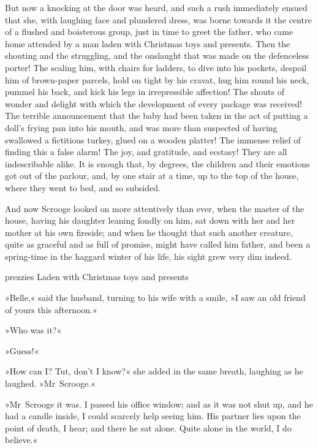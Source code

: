 But now a knocking at the door was heard, and such a rush immediately ensued that she, with laughing face and plundered dress, was borne towards it the centre of a flushed and boisterous group, just in time to greet the father, who came home attended by a man laden with Christmas toys and presents. Then the shouting and the struggling, and the onslaught that was made on the defenceless porter! The scaling him, with chairs for ladders, to dive into his pockets, despoil him of brown-paper parcels, hold on tight by his cravat, hug him round his neck, pummel his back, and kick his legs in irrepressible affection! The shouts of wonder and delight with which the development of every package was received! The terrible announcement that the baby had been taken in the act of putting a doll's frying pan into his mouth, and was more than suspected of having swallowed a fictitious turkey, glued on a wooden platter! The immense relief of finding this a false alarm! The joy, and gratitude, and ecstasy! They are all indescribable alike. It is enough that, by degrees, the children and their emotions got out of the parlour, and, by one stair at a time, up to the top of the house, where they went to bed, and so subsided.

And now Scrooge looked on more attentively than ever, when the master of the house, having his daughter leaning fondly on him, sat down with her and her mother at his own fireside; and when he thought that such another creature, quite as graceful and as full of promise, might have called him father, and been a spring-time in the haggard winter of his life, his sight grew very dim indeed.

\begin{colorbigpic}
	[\bigpicsize]
	{prezzies}
	{Laden with Christmas toys and presents}
\end{colorbigpic}


»Belle,« said the husband, turning to his wife with a smile, »I saw an old friend of yours this afternoon.«

»Who was it?«

»Guess!«

»How can I\@? Tut, don't I know?« she added in the same breath, laughing as he laughed. »Mr~Scrooge.«

»Mr~Scrooge it was. I passed his office window; and as it was not shut up, and he had a candle inside, I could scarcely help seeing him. His partner lies upon the point of death, I hear; and there he sat alone. Quite alone in the world, I do believe.«

